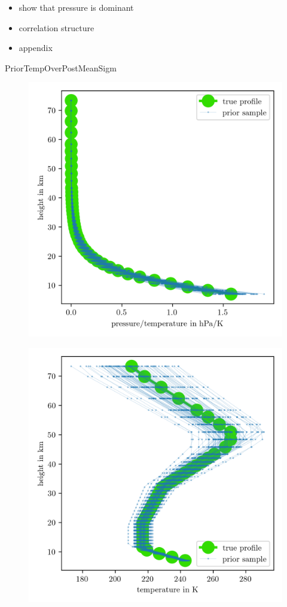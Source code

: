 \begin{itemize}
	\item show that pressure is dominant
	\item correlation structure
	\item appendix
\end{itemize}

PriorTempOverPostMeanSigm



\begin{figure}[ht!]
	\centering
	\includegraphics{PriorTempOverPostMeanSigm.png}
	\caption[]{}
	\label{fig:}
\end{figure}

\begin{figure}[ht!]
	\centering
	\includegraphics{PriorTempPostMeanSigm.png}
	\caption[]{}
	\label{fig:}
\end{figure}

